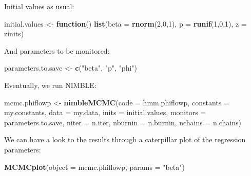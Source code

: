 \documentclass[
  12pt,
]{krantz}
\newenvironment{Shaded}{\begin{snugshade}}{\end{snugshade}}
\newcommand{\AttributeTok}[1]{\textcolor[rgb]{0.13,0.29,0.53}{#1}}
\newcommand{\ControlFlowTok}[1]{\textcolor[rgb]{0.13,0.29,0.53}{\textbf{#1}}}
\newcommand{\DecValTok}[1]{\textcolor[rgb]{0.00,0.00,0.81}{#1}}
\newcommand{\FunctionTok}[1]{\textcolor[rgb]{0.13,0.29,0.53}{\textbf{#1}}}
\newcommand{\NormalTok}[1]{#1}
\newcommand{\OtherTok}[1]{\textcolor[rgb]{0.56,0.35,0.01}{#1}}
\newcommand{\StringTok}[1]{\textcolor[rgb]{0.31,0.60,0.02}{#1}}
\begin{document}
Initial values as usual:

\begin{Shaded}
\begin{Highlighting}[]
\NormalTok{initial.values }\OtherTok{\textless{}{-}} \ControlFlowTok{function}\NormalTok{() }\FunctionTok{list}\NormalTok{(}\AttributeTok{beta =} \FunctionTok{rnorm}\NormalTok{(}\DecValTok{2}\NormalTok{,}\DecValTok{0}\NormalTok{,}\DecValTok{1}\NormalTok{),}
                                  \AttributeTok{p =} \FunctionTok{runif}\NormalTok{(}\DecValTok{1}\NormalTok{,}\DecValTok{0}\NormalTok{,}\DecValTok{1}\NormalTok{),}
                                  \AttributeTok{z =}\NormalTok{ zinits)}
\end{Highlighting}
\end{Shaded}

And parameters to be monitored:

\begin{Shaded}
\begin{Highlighting}[]
\NormalTok{parameters.to.save }\OtherTok{\textless{}{-}} \FunctionTok{c}\NormalTok{(}\StringTok{"beta"}\NormalTok{, }\StringTok{"p"}\NormalTok{, }\StringTok{"phi"}\NormalTok{)}
\end{Highlighting}
\end{Shaded}

Eventually, we run NIMBLE:

\begin{Shaded}
\begin{Highlighting}[]
\NormalTok{mcmc.phiflowp }\OtherTok{\textless{}{-}} \FunctionTok{nimbleMCMC}\NormalTok{(}\AttributeTok{code =}\NormalTok{ hmm.phiflowp, }
                          \AttributeTok{constants =}\NormalTok{ my.constants,}
                          \AttributeTok{data =}\NormalTok{ my.data,              }
                          \AttributeTok{inits =}\NormalTok{ initial.values,}
                          \AttributeTok{monitors =}\NormalTok{ parameters.to.save,}
                          \AttributeTok{niter =}\NormalTok{ n.iter,}
                          \AttributeTok{nburnin =}\NormalTok{ n.burnin, }
                          \AttributeTok{nchains =}\NormalTok{ n.chains)}
\end{Highlighting}
\end{Shaded}

We can have a look to the results through a caterpillar plot of the regression parameters:

\begin{Shaded}
\begin{Highlighting}[]
\FunctionTok{MCMCplot}\NormalTok{(}\AttributeTok{object =}\NormalTok{ mcmc.phiflowp, }\AttributeTok{params =} \StringTok{"beta"}\NormalTok{)}
\end{Highlighting}
\end{Shaded}
\end{document}
